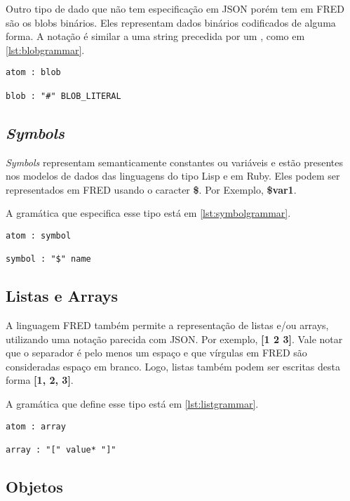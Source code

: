 Outro tipo de dado que não tem especificação em JSON porém tem em FRED são os blobs binários. Eles
representam dados binários codificados de alguma forma. A notação é similar a uma string precedida
por um , como em \ref{lst:blobgrammar}.

\begin{lstlisting}[caption=Gramática para blobs,label={lst:blobgrammar}]
atom : blob

blob : "#" BLOB_LITERAL
\end{lstlisting}

\subsection{\textit{Symbols}}

\textit{Symbols} representam semanticamente constantes ou variáveis e estão 
presentes nos modelos de dados das linguagens do tipo Lisp e em Ruby. 
Eles podem ser representados em FRED usando o caracter \textbf{\$}. Por Exemplo, \textbf{\$var1}.

A gramática que especifica esse tipo está em \ref{lst:symbolgrammar}.

\begin{lstlisting}[caption=Gramática para symbols,label={lst:symbolgrammar}]
atom : symbol

symbol : "$" name
\end{lstlisting}

\subsection{Listas e Arrays}

A linguagem FRED também permite a representação de listas e/ou arrays, utilizando uma notação parecida com JSON.
Por exemplo, \textbf{[1 2 3]}. Vale notar que o separador é pelo menos um espaço e que vírgulas em FRED
são consideradas espaço em branco. Logo, listas também podem ser escritas desta forma \textbf{[1, 2, 3]}.

A gramática que define esse tipo está em \ref{lst:listgrammar}.

\begin{lstlisting}[caption=Gramática para listas,label={lst:listgrammar}]
atom : array

array : "[" value* "]"
\end{lstlisting}

\subsection{Objetos}

